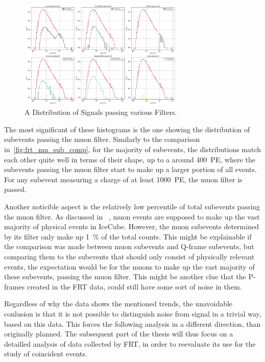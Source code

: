 \begin{figure}
    \centering
    \includegraphics[width=0.7\textwidth]{Plots/selected_filters_subplot.pdf}
    \caption{A Distribution of Signals passing various Filters.}
    \label{fig:filtermask}
\end{figure}

The most significant of these histograms is the one showing the distribution of subevents passing the muon filter. 
Similarly to the comparison in~\ref{fig:frt_mu_sub_comp}, for the majority of subevents, the distributions match each other quite well in terms of their shape, up 
to a around \num{400}~\unit{PE}, where the subevents passing the muon filter start to make up a larger portion of all events. For any subevent measuring a charge of 
at least \num{1000}~\unit{PE}, the muon filter is passed.  

Another noticible aspect is the relatively low percentile of total subevents passing the muon filter. As discussed in ~\cite{einstein}, muon events are supposed to make 
up the vast majority of physical events in IceCube. However, the muon subevents determined by its filter only make up \SI{1}{\percent} of the total counts. 
This might be explainable if the comparison was made between muon subevents and Q-frame subevents, but comparing them to the subevents that should only consist of  
physically relevant events, the expectation would be for the muons to make up the vast majority of these subevents, passing the muon filter. This might be another clue 
that the P-frames created in the FRT data, could still have some sort of noise in them. 

Regardless of why the data shows the mentioned trends, the unavoidable conlusion is that it is not possible to distinguish noise from signal in a trivial way, based 
on this data. This forces the following analysis in a different direction, than originally planned. The subsequent part of the thesis will thus focus on a detailled 
analysis of data collected by FRT, in order to reevaluate its use for the study of coincident events. 




